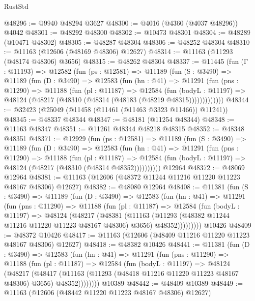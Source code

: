 \begin{lexlean}{RustStd}
\begin{coremodule}
@48296 := @9940 @48294 @3627
@48300 := @4016 (@4360 (@4037 @48296)) @4042
@48301 := @48292 @48300
@48302 := @10473 @48301
@48304 := @48289 (@10471 @48302)
@48305 := @48287 @48304
@48306 := @48252 @48304
@48310 := @11163 (@12606 (@48169 @48306) @12627)
@48314 := @11163 (@11293 (@48174 @48306) @3656)
@48315 := @48262 @48304
@48337 := @11445
    (fun (Γ : @11193) =>
    @12582
      (fun (ps : @12581) =>
      @11189
        (fun (S : @3490) =>
        @11189
          (fun (D : @3490) =>
          @12583
            (fun (hn : @41) =>
            @11291
              (fun (pns : @11290) =>
              @11188
                (fun (pl : @11187) =>
                @12584
                  (fun (bodyL : @11197) =>
                  @48124 (@48217 (@48310 (@48314 (@48183 (@48219 @48315)))))))))))))
@48344 := @32423 (@25049 (@11458 (@11461 (@11463 @3323 @11466)) @11241))
@48345 := @48337 @48344
@48347 := @48181 (@11254 @48344)
@48348 := @11163 @48347
@48351 := @11261 @48344 @48218 @48315
@48352 := @48348 @48351
@48371 := @12929
    (fun (ps : @12581) =>
    @11189
      (fun (S : @3490) =>
      @11189
        (fun (D : @3490) =>
        @12583
          (fun (hn : @41) =>
          @11291
            (fun (pns : @11290) =>
            @11188
              (fun (pl : @11187) =>
              @12584 (fun (bodyL : @11197) => @48124 (@48217 (@48310 (@48314 @48352))))))))))
    @12964
@48372 := @48069 @12964
@48381 := @11163 (@12606 (@48372 @11244 @11216 @11220 @11223 @48167 @48306) @12627)
@48382 := @48080 @12964
@48408 := @11381
    (fun (S : @3490) =>
    @11189
      (fun (D : @3490) =>
      @12583
        (fun (hn : @41) =>
        @11291
          (fun (pns : @11290) =>
          @11188
            (fun (pl : @11187) =>
            @12584
              (fun (bodyL : @11197) =>
              @48124
                (@48217
                  (@48381
                    (@11163
                      (@11293 (@48382 @11244 @11216 @11220 @11223 @48167 @48306) @3656)
                      @48352)))))))))
    @10426
@48409 := @48372 @10426
@48417 := @11163 (@12606 (@48409 @11216 @11220 @11223 @48167 @48306) @12627)
@48418 := @48382 @10426
@48441 := @11381
    (fun (D : @3490) =>
    @12583
      (fun (hn : @41) =>
      @11291
        (fun (pns : @11290) =>
        @11188
          (fun (pl : @11187) =>
          @12584
            (fun (bodyL : @11197) =>
            @48124
              (@48217
                (@48417
                  (@11163 (@11293 (@48418 @11216 @11220 @11223 @48167 @48306) @3656) @48352))))))))
    @10389
@48442 := @48409 @10389
@48449 := @11163 (@12606 (@48442 @11220 @11223 @48167 @48306) @12627)

\end{coremodule}
\end{lexlean}
